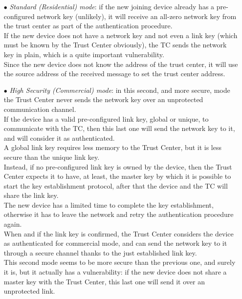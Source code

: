 \documentclass[12pt]{report}
\begin{document}
\begin{itemize}
\setlength{\itemindent}{+4mm}
\item[$\bullet$] \emph{Standard (Residential) mode}: if the new joining device already has a pre-configured network key (unlikely), it will receive an all-zero network key from the trust center as part of the authentication procedure.\\
If the new device does not have a network key and not even a link key (which must be known by the Trust Center obviously), the TC  sends the network key in plain, which is a quite important vulnerability.\\
Since the new device does not know the address of the trust center, it will use the source address of the received message to set the trust center address.

\item[$\bullet$] \emph{High Security (Commercial) mode}: in this second, and more secure, mode the Trust Center never sends the network key over an unprotected communication channel.\\
If the device has a valid pre-configured link key, global or unique, to communicate with the TC, then this last one will send the network key to it, and will consider it as authenticated.\\
A global link key requires less memory to the Trust Center, but it is less secure than the unique link key.\\
Instead, if no pre-configured link key is owned by the device, then the Trust Center expects it to have, at least, the master key by which it is possible to start the key establishment protocol, after that the device and the TC will share the link key.\\
The new device has a limited time to complete the key establishment, otherwise it has to leave the network and retry the authentication procedure again.\\
When and if the link key is confirmed, the Trust Center considers the device as authenticated for commercial mode, and can send the network key to it through a secure channel thanks to the just established link key.\\

This second mode seems to be more secure than the previous one, and surely it is, but it actually has a vulnerability: if the new device does not share a master key with the Trust Center, this last one will send it over an unprotected link. 

\end{itemize}
\end{document}
